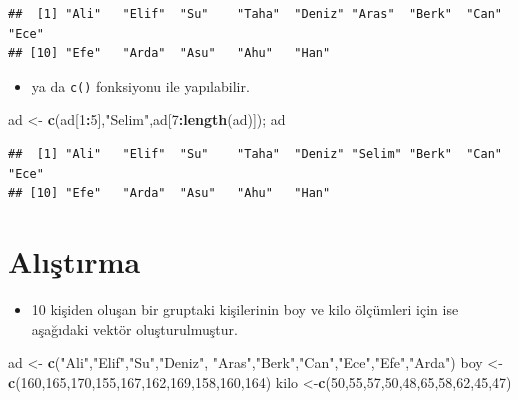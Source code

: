 \documentclass[
  oneside]{book}
\newenvironment{Shaded}{\begin{snugshade}}{\end{snugshade}}
\newcommand{\DecValTok}[1]{\textcolor[rgb]{0.00,0.00,0.81}{#1}}
\newcommand{\FunctionTok}[1]{\textcolor[rgb]{0.13,0.29,0.53}{\textbf{#1}}}
\newcommand{\NormalTok}[1]{#1}
\newcommand{\OtherTok}[1]{\textcolor[rgb]{0.56,0.35,0.01}{#1}}
\newcommand{\SpecialCharTok}[1]{\textcolor[rgb]{0.81,0.36,0.00}{\textbf{#1}}}
\newcommand{\StringTok}[1]{\textcolor[rgb]{0.31,0.60,0.02}{#1}}
\providecommand{\tightlist}{%
  \setlength{\itemsep}{0pt}\setlength{\parskip}{0pt}}
\begin{document}
\begin{verbatim}
##  [1] "Ali"   "Elif"  "Su"    "Taha"  "Deniz" "Aras"  "Berk"  "Can"   "Ece"  
## [10] "Efe"   "Arda"  "Asu"   "Ahu"   "Han"
\end{verbatim}

\begin{itemize}
\tightlist
\item
  ya da \texttt{c()} fonksiyonu ile yapılabilir.
\end{itemize}

\begin{Shaded}
\begin{Highlighting}[]
\NormalTok{ad }\OtherTok{\textless{}{-}} \FunctionTok{c}\NormalTok{(ad[}\DecValTok{1}\SpecialCharTok{:}\DecValTok{5}\NormalTok{],}\StringTok{"Selim"}\NormalTok{,ad[}\DecValTok{7}\SpecialCharTok{:}\FunctionTok{length}\NormalTok{(ad)]); ad}
\end{Highlighting}
\end{Shaded}

\begin{verbatim}
##  [1] "Ali"   "Elif"  "Su"    "Taha"  "Deniz" "Selim" "Berk"  "Can"   "Ece"  
## [10] "Efe"   "Arda"  "Asu"   "Ahu"   "Han"
\end{verbatim}

\hypertarget{alux131ux15ftux131rma-1}{%
\section{Alıştırma}\label{alux131ux15ftux131rma-1}}

\begin{itemize}
\tightlist
\item
  10 kişiden oluşan bir gruptaki kişilerinin boy ve kilo ölçümleri için ise aşağıdaki vektör oluşturulmuştur.
\end{itemize}

\begin{Shaded}
\begin{Highlighting}[]
\NormalTok{ad  }\OtherTok{\textless{}{-}}  \FunctionTok{c}\NormalTok{(}\StringTok{"Ali"}\NormalTok{,}\StringTok{"Elif"}\NormalTok{,}\StringTok{"Su"}\NormalTok{,}\StringTok{"Deniz"}\NormalTok{,}
\StringTok{"Aras"}\NormalTok{,}\StringTok{"Berk"}\NormalTok{,}\StringTok{"Can"}\NormalTok{,}\StringTok{"Ece"}\NormalTok{,}\StringTok{"Efe"}\NormalTok{,}\StringTok{"Arda"}\NormalTok{)}
\NormalTok{boy }\OtherTok{\textless{}{-}} \FunctionTok{c}\NormalTok{(}\DecValTok{160}\NormalTok{,}\DecValTok{165}\NormalTok{,}\DecValTok{170}\NormalTok{,}\DecValTok{155}\NormalTok{,}\DecValTok{167}\NormalTok{,}\DecValTok{162}\NormalTok{,}\DecValTok{169}\NormalTok{,}\DecValTok{158}\NormalTok{,}\DecValTok{160}\NormalTok{,}\DecValTok{164}\NormalTok{)}
\NormalTok{kilo }\OtherTok{\textless{}{-}}\FunctionTok{c}\NormalTok{(}\DecValTok{50}\NormalTok{,}\DecValTok{55}\NormalTok{,}\DecValTok{57}\NormalTok{,}\DecValTok{50}\NormalTok{,}\DecValTok{48}\NormalTok{,}\DecValTok{65}\NormalTok{,}\DecValTok{58}\NormalTok{,}\DecValTok{62}\NormalTok{,}\DecValTok{45}\NormalTok{,}\DecValTok{47}\NormalTok{)}
\end{Highlighting}
\end{Shaded}
\end{document}
